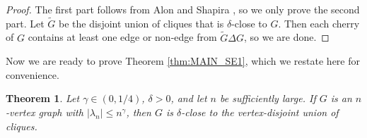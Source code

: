 \documentclass[11pt]{article}
\theoremstyle{plain}
\newtheorem{theorem}{Theorem}[section]
\theoremstyle{definition}
\begin{document}
\begin{proof}
The first part follows from Alon and Shapira \cite{AS06}, so we only prove the second part. Let $\widetilde{G}$ be the disjoint union of cliques that is $\delta$-close to $G$. Then each cherry of $G$ contains at least one edge or non-edge from $\widetilde{G}\Delta G$, so we are  done.
\end{proof}

Now we are ready to prove Theorem \ref{thm:MAIN_SE1}, which we restate here for convenience.

\begin{theorem}
Let $\gamma\in (0, 1/4)$, $\delta>0$, and let $n$ be sufficiently large. If $G$ is an $n$-vertex graph with $|\lambda_n|\leq n^{\gamma}$, then $G$ is $\delta$-close to the vertex-disjoint union of cliques. 
\end{theorem}
\end{document}

